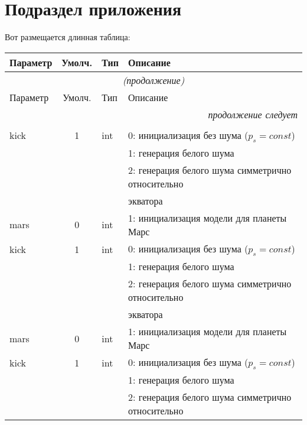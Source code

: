  \section{Подраздел приложения}\label{AppendixB1}
Вот размещается длинная таблица:
\fontsize{10pt}{10pt}\selectfont
\begin{longtable}[c]{|l|c|l|l|}
 \hline
 Параметр & Умолч. & Тип & Описание               \\ \hline
                                              \endfirsthead   \hline
 \multicolumn{4}{|c|}{\small\slshape (продолжение)}        \\ \hline
 Параметр & Умолч. & Тип & Описание               \\ \hline
                                              \endhead        \hline
 \multicolumn{4}{|r|}{\small\slshape продолжение следует}  \\ \hline
                                              \endfoot        \hline
                                              \endlastfoot
 \multicolumn{4}{|l|}{\&INP}        \\ \hline 
 kick & 1 & int & 0: инициализация без шума ($p_s = const$) \\
      &   &     & 1: генерация белого шума                  \\
      &   &     & 2: генерация белого шума симметрично относительно \\
  & & & экватора    \\
 mars & 0 & int & 1: инициализация модели для планеты Марс     \\
 kick & 1 & int & 0: инициализация без шума ($p_s = const$) \\
      &   &     & 1: генерация белого шума                  \\
      &   &     & 2: генерация белого шума симметрично относительно \\
  & & & экватора    \\
 mars & 0 & int & 1: инициализация модели для планеты Марс     \\
kick & 1 & int & 0: инициализация без шума ($p_s = const$) \\
      &   &     & 1: генерация белого шума                  \\
      &   &     & 2: генерация белого шума симметрично относительно \\

\end{longtable}
